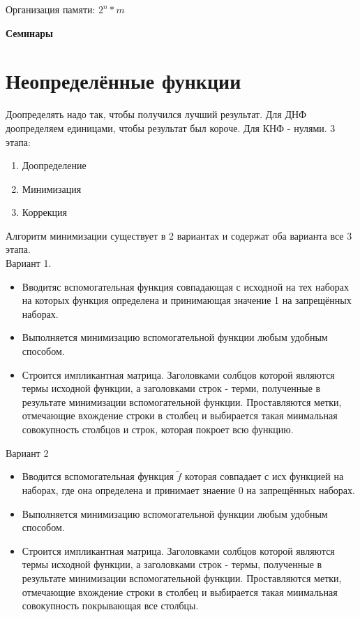 \documentclass[12px]{article}
\begin{document}
Организация памяти: $2^n * m$

\newpage
\setcounter{secnumdepth}{1}
\begin{center}
	\textbf{Семинары}
\end{center}

\section{Неопределённые функции}
Доопределять надо так, чтобы получился лучший результат. Для ДНФ доопределяем единицами, чтобы результат был короче. Для КНФ - нулями.
3 этапа:
\begin{enumerate}
	\item Доопределение
	\item Минимизация
	\item Коррекция		
\end{enumerate}

Алгоритм минимизации существует в 2 вариантах и содержат оба варианта все 3 этапа.\\
Вариант 1. 
\begin{itemize}
	\item Вводитяс вспомогательная функция  совпадающая с исходной на тех наборах на которых функция определена и принимающая значение 1 на запрещённых наборах.
	\item Выполняется минимизацию вспомогательной функции любым удобным способом.
	\item Строится импликантная матрица. Заголовками солбцов которой являются термы исходной функции, а заголовками строк - терми, полученные в результате минимизации вспомогательной функции. Проставляются метки, отмечающие вхождение строки в столбец и выбирается такая миимальная совокупность столбцов и строк, которая покроет всю функцию.
\end{itemize}
Вариант 2
\begin{itemize}
	\item Вводится вспомогательная функция $\tilde{f}$ которая совпадает с исх функцией на наборах, где она определена и принимает знаение 0 на запрещённых наборах.
	\item Выполняется минимизацию вспомогательной функции любым удобным способом.
	\item Строится импликантная матрица. Заголовками солбцов которой являются термы исходной функции, а заголовками строк - термы, полученные в результате минимизации вспомогательной функции. Проставляются метки, отмечающие вхождение строки в столбец и выбирается такая миимальная совокупность покрывающая все столбцы.
\end{itemize}
\end{document}
